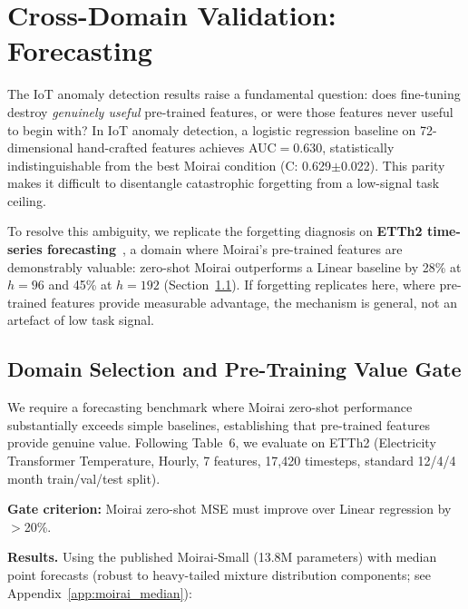 \section{Cross-Domain Validation: Forecasting}
\label{sec:forecasting}

The IoT anomaly detection results raise a fundamental question:
does fine-tuning destroy \emph{genuinely useful} pre-trained features,
or were those features never useful to begin with?
In IoT anomaly detection, a logistic regression baseline on 72-dimensional
hand-crafted features achieves AUC$=$0.630, statistically indistinguishable
from the best Moirai condition (C: 0.629$\pm$0.022).
This parity makes it difficult to disentangle catastrophic forgetting
from a low-signal task ceiling.

To resolve this ambiguity, we replicate the forgetting diagnosis on
\textbf{ETTh2 time-series forecasting}~\cite{zhou2021informer},
a domain where Moirai's pre-trained features are demonstrably valuable:
zero-shot Moirai outperforms a Linear baseline by 28\% at $h{=}96$
and 45\% at $h{=}192$ (Section~\ref{sec:forecasting:gate}).
If forgetting replicates here, where pre-trained features provide
measurable advantage, the mechanism is general, not an artefact
of low task signal.

\subsection{Domain Selection and Pre-Training Value Gate}
\label{sec:forecasting:gate}

We require a forecasting benchmark where Moirai zero-shot performance
substantially exceeds simple baselines, establishing that pre-trained
features provide genuine value.
Following \citet{woo2024moirai} Table~6, we evaluate on ETTh2
(Electricity Transformer Temperature, Hourly, 7 features, 17{,}420
timesteps, standard 12/4/4 month train/val/test split).

\textbf{Gate criterion:} Moirai zero-shot MSE must improve over
Linear regression by $>$20\%.

\textbf{Results.}
Using the published Moirai-Small (13.8M parameters) with median point
forecasts (robust to heavy-tailed mixture distribution components;
see Appendix~\ref{app:moirai_median}):

